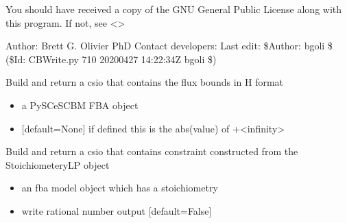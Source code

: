 \documentclass[letterpaper,10pt,english]{sphinxmanual}
\begin{document}
\sphinxAtStartPar
You should have received a copy of the GNU General Public License
along with this program.  If not, see \textless{}\textgreater{}

\sphinxAtStartPar
Author: Brett G. Olivier PhD
Contact developers: 
Last edit: \$Author: bgoli \$ (\$Id: CBWrite.py 710 2020\sphinxhyphen{}04\sphinxhyphen{}27 14:22:34Z bgoli \$)

\begin{fulllineitems}
\label{\detokenize{modules_doc:cbmpy.CBWrite.BuildHformatFluxBounds}}
\pysigstartsignatures
{}
\pysigstopsignatures
\sphinxAtStartPar
Build and return a csio that contains the flux bounds in H format
\begin{itemize}
\item {} 
\sphinxAtStartPar
{} a PySCeS\sphinxhyphen{}CBM FBA object

\item {} 
\sphinxAtStartPar
{} {[}default=None{]} if defined this is the abs(value) of +\sphinxhyphen{}\textless{}infinity\textgreater{}

\end{itemize}

\end{fulllineitems}


\begin{fulllineitems}
\label{\detokenize{modules_doc:cbmpy.CBWrite.BuildLPConstraints}}
\pysigstartsignatures
{}
\pysigstopsignatures
\sphinxAtStartPar
Build and return a csio that contains constraint constructed from
the StoichiometeryLP object
\begin{itemize}
\item {} 
\sphinxAtStartPar
{} an fba model object which has a stoichiometry

\item {} 
\sphinxAtStartPar
{} write rational number output {[}default=False{]}

\end{itemize}

\end{fulllineitems}
\end{document}
